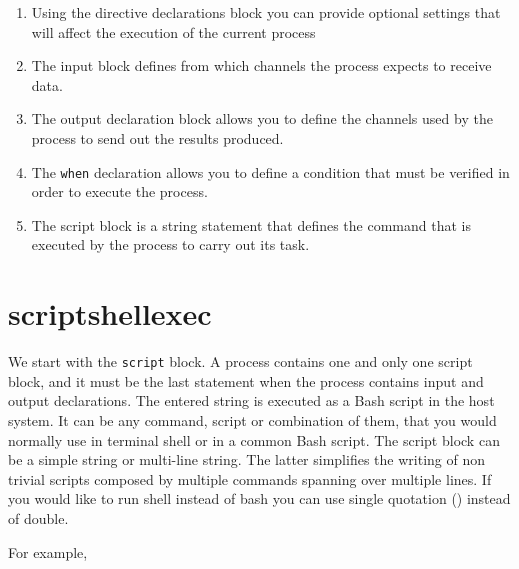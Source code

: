\documentclass[
]{book}
\newenvironment{Shaded}{\begin{snugshade}}{\end{snugshade}}
\newcommand{\BuiltInTok}[1]{#1}
\newcommand{\CommentTok}[1]{\textcolor[rgb]{0.56,0.35,0.01}{\textit{#1}}}
\newcommand{\ErrorTok}[1]{\textcolor[rgb]{0.64,0.00,0.00}{\textbf{#1}}}
\newcommand{\ExtensionTok}[1]{#1}
\newcommand{\NormalTok}[1]{#1}
\newcommand{\OperatorTok}[1]{\textcolor[rgb]{0.81,0.36,0.00}{\textbf{#1}}}
\newcommand{\StringTok}[1]{\textcolor[rgb]{0.31,0.60,0.02}{#1}}
\newcommand{\VariableTok}[1]{\textcolor[rgb]{0.00,0.00,0.00}{#1}}
\providecommand{\tightlist}{%
  \setlength{\itemsep}{0pt}\setlength{\parskip}{0pt}}
\begin{document}
\begin{enumerate}
\def\labelenumi{\arabic{enumi}.}
\tightlist
\item
  Using the directive declarations block you can provide optional settings that will affect the execution of the current process
\item
  The input block defines from which channels the process expects to receive data.
\item
  The output declaration block allows you to define the channels used by the process to send out the results produced.
\item
  The \texttt{when} declaration allows you to define a condition that must be verified in order to execute the process.
\item
  The script block is a string statement that defines the command that is executed by the process to carry out its task.
\end{enumerate}

\hypertarget{scriptshellexec}{%
\section{script\textbar shell\textbar exec}\label{scriptshellexec}}

We start with the \texttt{script} block. A process contains one and only one script block, and it must be the last statement when the process contains input and output declarations. The entered string is executed as a Bash script in the host system. It can be any command, script or combination of them, that you would normally use in terminal shell or in a common Bash script. The script block can be a simple string or multi-line string. The latter simplifies the writing of non trivial scripts composed by multiple commands spanning over multiple lines. If you would like to run shell instead of bash you can use single quotation (\texttt{\textquotesingle{}\textquotesingle{}\textquotesingle{}}) instead of double.

For example,

\begin{Shaded}
\end{Shaded}
\end{document}
